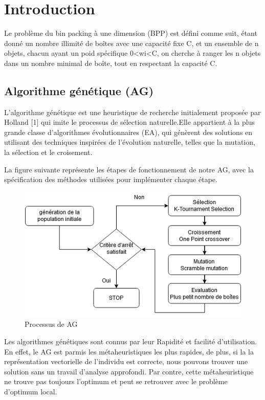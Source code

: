 \documentclass[preprint]{elsarticle}
\begin{document}

\section{Introduction}
\label{S:1}

Le problème du bin packing à une dimension (BPP) est défini comme suit, étant donné un nombre illimité de boîtes avec une capacité fixe C, et un ensemble de n objets, chacun ayant un poid spécifique 0<wi<C, on cherche à ranger les n objets dans un nombre minimal de boîte, tout en respectant la capacité C. 


\subsection{Algorithme génétique (AG)}
L’algorithme génétique est une heuristique de recherche initialement proposée par Holland [1] qui imite le processus de sélection naturelle.Elle appartient à la plus grande classe d'algorithmes évolutionnaires (EA), qui génèrent des solutions en utilisant des techniques inspirées de l'évolution naturelle, telles que la mutation, la sélection et le croisement.

La figure suivante représente les étapes de fonctionnement de notre AG, avec la spécification des méthodes utilisées pour implémenter chaque étape. 

\begin{figure}[!h]
    \centering
    \includegraphics[scale=0.6]{./figures/AG schema.png}
    \caption{Processus de AG }
    \label{fig:agschema}
\end{figure}
Les algorithmes génétiques sont connus par leur Rapidité et facilité d’utilisation. 
En effet, le AG est parmis les métaheuristiques les plus rapides, de plus, si la la représentation vectorielle de l'individu est correcte, nous pouvons trouver une solution sans un travail d'analyse approfondi. Par contre, cette métaheuristique ne trouve pas toujours l’optimum et peut se retrouver avec le problème d’optimum local. 
\end{document}
